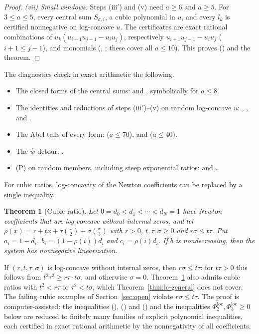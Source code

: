 \documentclass[twoside,10pt]{article}
\numberwithin{equation}{section}
\theoremstyle{slbody}
\newtheorem{theorem}{Theorem}[section]
\theoremstyle{definition}
\theoremstyle{remark}
\renewcommand{\eqref}[1]{\textup{{\normalfont(\oldstylenums{\ref{#1}}}\normalfont)}}
\begin{document}
\begin{proof}
\emph{(vii) Small windows.} Steps (iii$'$) and (v) need $a\geq6$ and $a\geq5$. For $3\leq a\leq5$, every central sum $S_{\sigma,i}$, a cubic polynomial in $u$, and every $l_k$ is certified nonnegative on log-concave $u$. The certificates are exact rational combinations of $u_k(u_{i+1}u_{j-1}-u_iu_j)$, respectively $u_{i+1}u_{j-1}-u_iu_j$ ($i+1\leq j-1$), and monomials (, ; these cover all $a\leq10$). This proves \eqref{eq:G-key} and the theorem.
\end{proof}

The diagnostics check in exact arithmetic the following.
\begin{itemize}
\item The closed forms of the central sums:  and , symbolically for $a\leq8$.
\item The identities and reductions of steps (iii$'$)--(v) on random log-concave $u$: , ,  and .
\item The Abel tails of every form:  ($a\leq70$),  and  ($a\leq40$).
\item The $\widehat w$ detour: .
\item (P) on random members, including steep exponential ratios:  and .
\end{itemize}

For cubic ratios, log-concavity of the Newton coefficients can be replaced by a single inequality.

\begin{theorem}[Cubic ratio]\label{thm:lc-cubic}
Let $0=d_0<d_1<\cdots<d_N=1$ have Newton coefficients that are log-concave without internal zeros, and let $\rho(x)=r+tx+\tau\binom x2+\sigma\binom x3$ with $r>0$, $t,\tau,\sigma\geq0$ and $r\sigma\leq t\tau$. Put $a_i=1-d_i$, $b_i=(1-\rho(i))d_i$ and $c_i=\rho(i)d_i$. If $b$ is nondecreasing, then the system has nonnegative linearization.
\end{theorem}

If $(r,t,\tau,\sigma)$ is log-concave without internal zeros, then $r\sigma\leq t\tau$: for $t\tau>0$ this follows from $t^2\tau^2\geq r\tau\cdot t\sigma$, and otherwise $\sigma=0$. Theorem~\ref{thm:lc-cubic} also admits cubic ratios with $t^2<r\tau$ or $\tau^2<t\sigma$, which Theorem~\ref{thm:lc-general} does not cover. The failing cubic examples of Section~\ref{sec:open} violate $r\sigma\leq t\tau$. The proof is computer-assisted: the inequalities \eqref{eq:cubic-B}, \eqref{eq:cubic-corner} and \eqref{eq:cubic-E} and the inequalities $\Phi^{\mathrm{loc}}_2,\Phi^{\mathrm{loc}}_3\geq0$ below are reduced to finitely many families of explicit polynomial inequalities, each certified in exact rational arithmetic by the nonnegativity of all coefficients.
\end{document}
